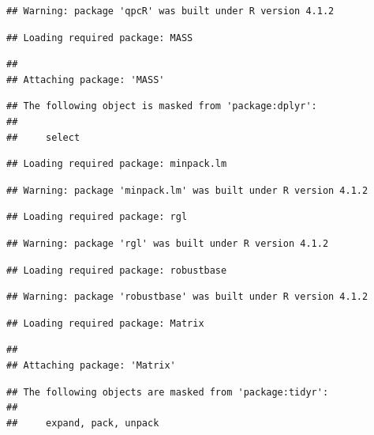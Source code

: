 \documentclass[
]{book}
\begin{document}
\begin{verbatim}
## Warning: package 'qpcR' was built under R version 4.1.2
\end{verbatim}

\begin{verbatim}
## Loading required package: MASS
\end{verbatim}

\begin{verbatim}
## 
## Attaching package: 'MASS'
\end{verbatim}

\begin{verbatim}
## The following object is masked from 'package:dplyr':
## 
##     select
\end{verbatim}

\begin{verbatim}
## Loading required package: minpack.lm
\end{verbatim}

\begin{verbatim}
## Warning: package 'minpack.lm' was built under R version 4.1.2
\end{verbatim}

\begin{verbatim}
## Loading required package: rgl
\end{verbatim}

\begin{verbatim}
## Warning: package 'rgl' was built under R version 4.1.2
\end{verbatim}

\begin{verbatim}
## Loading required package: robustbase
\end{verbatim}

\begin{verbatim}
## Warning: package 'robustbase' was built under R version 4.1.2
\end{verbatim}

\begin{verbatim}
## Loading required package: Matrix
\end{verbatim}

\begin{verbatim}
## 
## Attaching package: 'Matrix'
\end{verbatim}

\begin{verbatim}
## The following objects are masked from 'package:tidyr':
## 
##     expand, pack, unpack
\end{verbatim}
\end{document}

